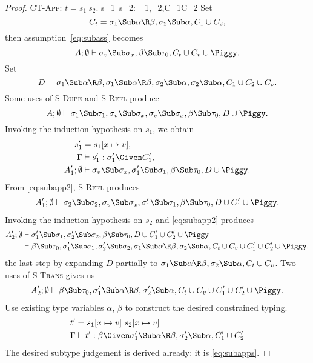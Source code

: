 \documentclass{amsart}
\theoremstyle{definition}
\begin{document}
\begin{proof}
\Case\textsc{CT-App}: $t=s_1~s_2$.
{\Gamma\vdash s_1~s_2:\beta\Given
\sigma_1\Sub\alpha\R\beta,\sigma_2\Sub\alpha,C_1\cup C_2
}
Set
\[
C_t=\sigma_1\Sub\alpha\R\beta,\sigma_2\Sub\alpha,C_1\cup C_2,
\]
then assumption~\eqref{eq:subass} becomes
\[
A;\emptyset\vdash
  \sigma_v\Sub\sigma_x,
  \beta\Sub\tau_0,
  C_t\cup C_v\cup\Piggy.
\]
Set
\[
D=
\sigma_1\Sub\alpha\R\beta,
\sigma_1\Sub\alpha\R\beta,
\sigma_2\Sub\alpha,
\sigma_2\Sub\alpha,C_1\cup C_2\cup C_v.
\]
Some uses of \textsc{S-Dupe} and \textsc{S-Refl} produce
\[
A;\emptyset\vdash
  \sigma_1\Sub\sigma_1,
  \sigma_v\Sub\sigma_x,\sigma_v\Sub\sigma_x,
  \beta\Sub\tau_0,
  D\cup\Piggy.
\]
Invoking the induction hypothesis on $s_1$, we obtain
\begin{align}
s_1'&=s_1[x\mapsto v]\notag,
\\
\Gamma&\vdash s_1' : \sigma_1' \Given C_1',
\label{eq:subapp1}
\\
A_1';\emptyset&\vdash
  \sigma_v\Sub\sigma_x,
  \sigma_1'\Sub\sigma_1,
  \beta\Sub\tau_0,
  D\cup\Piggy.
\label{eq:subapp2}
\end{align}
From \eqref{eq:subapp2}, \textsc{S-Refl} produces
\begin{align}
A_1';\emptyset\vdash
  \sigma_2\Sub\sigma_2,
  \sigma_v\Sub\sigma_x,
  \sigma_1'\Sub\sigma_1,
  \beta\Sub\tau_0,
  D\cup C_1'\cup\Piggy.
\label{eq:subappf}
\end{align}
Invoking the induction hypothesis on $s_2$ and \eqref{eq:subapp2}
produces
\begin{align}
A_2';\emptyset&\vdash
  \sigma_1'\Sub\sigma_1,
  \sigma_2'\Sub\sigma_2,
  \beta\Sub\tau_0,
  D\cup C_1'\cup C_2'\cup\Piggy
\notag\\
&\vdash
  \beta\Sub\tau_0,
  \sigma_1'\Sub\sigma_1,
  \sigma_2'\Sub\sigma_2,
  \sigma_1\Sub\alpha\R\beta,\sigma_2\Sub\alpha,
  C_t\cup C_v\cup C_1'\cup C_2'\cup\Piggy,
\notag
\end{align}
the last step by expanding $D$ partially to
$\sigma_1\Sub\alpha\R\beta,\sigma_2\Sub\alpha,C_t\cup C_v$.
Two uses of \textsc{S-Trans} gives us
\begin{align}
A_2';\emptyset\vdash
  \beta\Sub\tau_0,
  \sigma_1'\Sub\alpha\R\beta,\sigma_2'\Sub\alpha,
  C_t\cup C_v\cup C_1'\cup C_2'\cup\Piggy.
\label{eq:subapps}
\end{align}
Use existing type variables $\alpha$, $\beta$ to construct the
desired constrained typing.
\begin{align}
t'&=s_1[x\mapsto v]~s_2[x\mapsto v]
\notag\\
\Gamma&\vdash t':
\beta\Given
\sigma_1'\Sub\alpha\R\beta,\sigma_2'\Sub\alpha,
C_1'\cup C_2'
\notag
\end{align}
The desired subtype judgement is derived already: it is
\eqref{eq:subapps}.
\end{proof}


\end{document}
